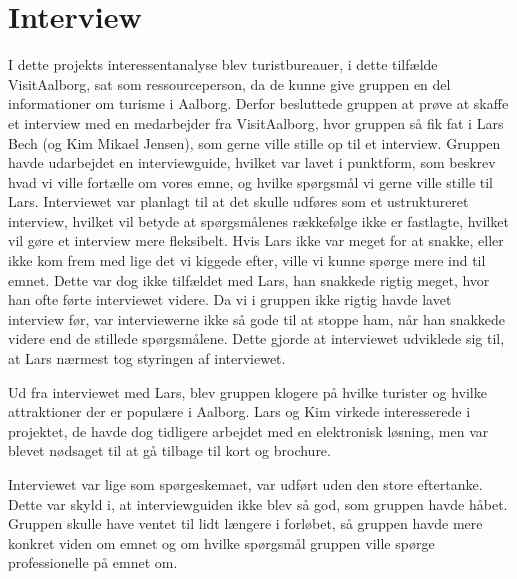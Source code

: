 \section{Interview}
I dette projekts interessentanalyse blev turistbureauer, i dette tilfælde VisitAalborg, sat som ressourceperson, da de kunne give gruppen en del informationer om turisme i Aalborg. Derfor besluttede gruppen at prøve at skaffe et interview med en medarbejder fra VisitAalborg, hvor gruppen så fik fat i Lars Bech (og Kim Mikael Jensen), som gerne ville stille op til et interview. Gruppen havde udarbejdet en interviewguide, hvilket var lavet i punktform, som beskrev hvad vi ville fortælle om vores emne, og hvilke spørgsmål vi gerne ville stille til Lars. Interviewet var planlagt til at det skulle udføres som et ustruktureret interview, hvilket vil betyde at spørgsmålenes rækkefølge ikke er fastlagte, hvilket vil gøre et interview mere fleksibelt. Hvis Lars ikke var meget for at snakke, eller ikke kom frem med lige det vi kiggede efter, ville vi kunne spørge mere ind til emnet. Dette var dog ikke tilfældet med Lars, han snakkede rigtig meget, hvor han ofte førte interviewet videre. Da vi i gruppen ikke rigtig havde lavet interview før, var interviewerne ikke så gode til at stoppe ham, når han snakkede videre end de stillede spørgsmålene. Dette gjorde at interviewet udviklede sig til, at Lars nærmest tog styringen af interviewet.

Ud fra interviewet med Lars, blev gruppen klogere på hvilke turister og hvilke attraktioner der er populære i Aalborg. Lars og Kim virkede interesserede i projektet, de havde dog tidligere arbejdet med en elektronisk løsning, men var blevet nødsaget til at gå tilbage til kort og brochure. 

Interviewet var lige som spørgeskemaet, var udført uden den store eftertanke. Dette var skyld i, at interviewguiden ikke blev så god, som gruppen havde håbet. Gruppen skulle have ventet til lidt længere i forløbet, så gruppen havde mere konkret viden om emnet og om hvilke spørgsmål gruppen ville spørge professionelle på emnet om. 

